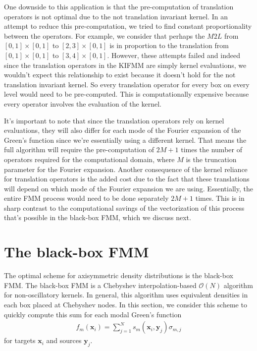 \documentclass[11pt, oneside]{article}   	%
\begin{document}
One downside to this application is that the pre-computation of translation operators is not optimal due to the not translation invariant kernel. In an attempt to reduce this pre-computation, we tried to find constant proportionality between the operators. For example, we consider that perhaps the $M2L$ from $[0,1]\times[0,1]$ to $[2,3]\times[0,1]$ is in proportion to the translation from $[0,1]\times[0,1]$ to $[3,4]\times[0,1]$. However, these attempts failed and indeed since the translation operators in the KIFMM are simply kernel evaluations, we wouldn't expect this relationship to exist because it doesn't hold for the not translation invariant kernel. So every translation operator for every box on every level would need to be pre-computed. This is computationally expensive because every operator involves the evaluation of the kernel.

It's important to note that since the translation operators rely on kernel evaluations, they will also differ for each mode of the Fourier expansion of the Green's function since we're essentially using a different kernel. That means the full algorithm will require the pre-computation of $2M+1$ times the number of operators required for the computational domain, where $M$ is the truncation parameter for the Fourier expansion. Another consequence of the kernel reliance for translation operators is the added cost due to the fact that these translations will depend on which mode of the Fourier expansion we are using. Essentially, the entire FMM process would need to be done separately $2M+1$ times. This is in sharp contrast to the computational savings of the vectorization of this process that's possible in the black-box FMM, which we discuss next.

\section{The black-box FMM}
The optimal scheme for axisymmetric density distributions is the black-box FMM. The black-box FMM is a Chebyshev interpolation-based $\mathcal{O}(N)$ algorithm for non-oscillatory kernels. In general, this algorithm uses equivalent densities in each box placed at Chebyshev nodes. In this section, we consider this scheme to quickly compute this sum for each modal Green's function
\begin{align}
f_m(\mathbf{x}_i)=\sum_{j=1}^N s_m(\mathbf{x}_i,\mathbf{y}_j)\sigma_{m,j}
\end{align}
for targets $\mathbf{x}_i$ and sources $\mathbf{y}_j$.
\end{document}
